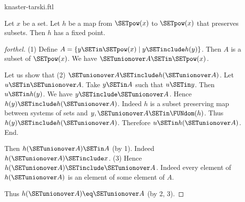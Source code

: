 \documentclass{naproche-library}
\begin{document}
\begin{smodule}[title=The Knaster-Tarski Fixed Point Theorem]{knaster-tarski.ftl}

\begin{theorem}[forthel,title=Knaster-Tarski,id=knaster_tarski]
  Let $x$ be a set.
  Let $h$ be a map from $\SETpow(x)$ to $\SETpow(x)$ that preserves subsets.
  Then $h$ has a fixed point.
\end{theorem}
\begin{proof}[forthel]
  (1) Define $A = \{y \SETin \SETpow(x) \mid y \SETinclude h(y)\}$.
  Then $A$ is a subset of $\SETpow(x)$.
  We have $\SETunionover A \SETin \SETpow(x)$.

  Let us show that (2) $\SETunionover A \SETinclude h(\SETunionover A)$.
    Let $u \SETin \SETunionover A$.
    Take $y \SETin A$ such that $u \SETin y$.
    Then $u \SETin h(y)$.
    We have $y \SETinclude \SETunionover A$.
    Hence $h(y) \SETinclude h(\SETunionover A)$.
    Indeed $h$ is a subset preserving map between systems of sets and $y, \SETunionover A \SETin \FUNdom(h)$.
    Thus $h(y) \SETinclude h(\SETunionover A)$.
    Therefore $u \SETin h(\SETunionover A)$.
  End.

  Then $h(\SETunionover A) \SETin A$ (by 1).
  Indeed $h(\SETunionover A) \SETinclude x$.
  (3) Hence $h(\SETunionover A) \SETinclude \SETunionover A$.
  Indeed every element of $h(\SETunionover A)$ is an element of some element of
  $A$.

  Thus $h(\SETunionover A) \eq \SETunionover A$ (by 2, 3).
\end{proof}
\end{smodule}
\end{document}
